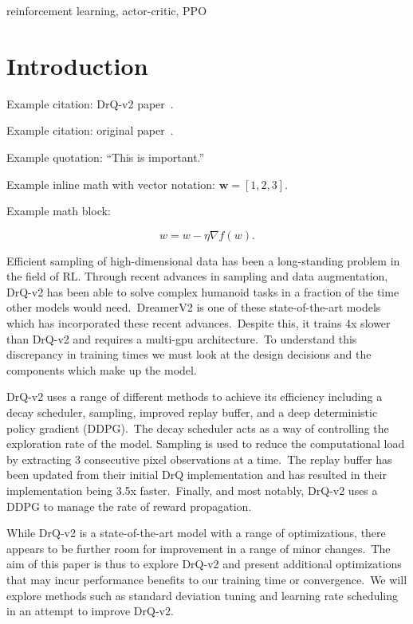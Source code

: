 \documentclass[conference]{./IEEEtran/IEEEtran} %
\begin{document}
    \begin{IEEEkeywords}
        reinforcement learning, actor-critic, PPO
    \end{IEEEkeywords}

    \section{Introduction}\label{sec:introduction}
    Example citation: DrQ-v2 paper~\cite{yarats2021drqv2}.

    Example citation: original paper~\cite{yarats2021image}.

    Example quotation: \enquote{This is important.}

    Example inline math with vector notation: \(\mathbf{w} = [1, 2, 3]\).

    Example math block:

    \[w = w - \eta \nabla f(w).\]

    Efficient sampling of high-dimensional data has been a long-standing problem in the field of RL. Through recent advances in
    sampling and data augmentation, DrQ-v2 has been able to solve complex humanoid tasks in a fraction of the time other models 
    would need.\ DreamerV2 is one of these state-of-the-art models which has incorporated these recent advances.\ Despite this, it
    trains 4x slower than DrQ-v2 and requires a multi-gpu architecture.\ To understand this discrepancy in training times we must
    look at the design decisions and the components which make up the model.

    DrQ-v2 uses a range of different methods to achieve its efficiency including a decay scheduler, sampling, improved replay buffer, 
    and a deep deterministic policy gradient (DDPG).\ The decay scheduler acts as a way of controlling the exploration rate of the model.
    Sampling is used to reduce the computational load by extracting 3 consecutive pixel observations at a time.\ The replay buffer has
    been updated from their initial DrQ implementation and has resulted in their implementation being 3.5x faster.\ Finally, and most
    notably, DrQ-v2 uses a DDPG to manage the rate of reward propagation.

    While DrQ-v2 is a state-of-the-art model with a range of optimizations, there appears to be further room for improvement in a range 
    of minor changes.\ The aim of this paper is thus to explore DrQ-v2 and present additional optimizations that may incur performance
    benefits to our training time or convergence.\ We will explore methods such as standard deviation tuning and learning rate scheduling
    in an attempt to improve DrQ-v2.
\end{document}
